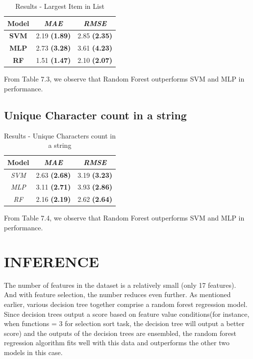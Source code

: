 \begin{table}[h]  
\centering
\caption{Results - Largest Item in List}
\begin{tabular}{|c|c|c|}
\hline
\textbf{Model} & \textit{\textbf{MAE}} & \textit{\textbf{RMSE}} \\ \hline
\textbf{SVM}   & 2.19 \textbf{(1.89)}           & 2.85 \textbf{(2.35)}            \\ \hline
\textbf{MLP}   & 2.73 \textbf{(3.28)}           & 3.61 \textbf{(4.23) }           \\ \hline
\textbf{RF}    & 1.51 \textbf{(1.47)}           & 2.10 \textbf{(2.07)}            \\ \hline
\end{tabular}

\label{tab:larg-list}
\end{table}

From Table 7.3, we observe that Random Forest outperforms SVM and MLP in performance. 


\subsection{Unique Character count in a string}

\begin{table}[h]
\centering
\caption{Results - Unique Characters count in a string}
\begin{tabular}{|c|c|c|}
\hline
\textbf{Model} & \textit{\textbf{MAE}} & \textit{\textbf{RMSE}} \\ \hline
\textit{SVM} & 2.63 \textbf{(2.68)} & 3.19 \textbf{(3.23)} \\ \hline
\textit{MLP} & 3.11 \textbf{(2.71)} & 3.93 \textbf{(2.86)} \\ \hline
\textit{RF} & 2.16 \textbf{(2.19)} & 2.62 \textbf{(2.64)} \\ \hline
\end{tabular}

\label{tab:unique}
\end{table}

From Table 7.4, we observe that Random Forest outperforms SVM and MLP in performance. 

\section{INFERENCE}

The number of features in the dataset is a relatively small (only 17
features). And with feature selection, the number reduces even
further.  As mentioned earlier, various decision tree together comprise a random forest regression model. Since decision trees output a score based on feature value conditions(for instance, when functions = 3 for selection sort task, the decision tree will output a better score) and the outputs of the decision trees are ensembled, the random forest regression algorithm fits well with this data and outperforms the other two models in this case.

